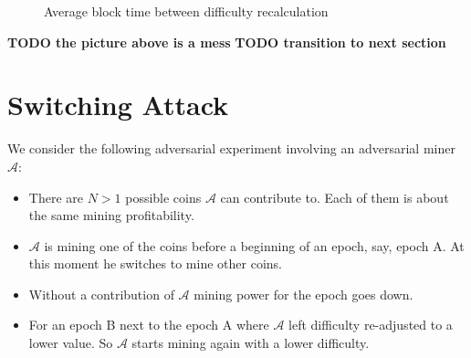 \documentclass[]{llncs}
\begin{document}
\begin{figure}[H]
\caption{Average block time between difficulty recalculation}
\label{fig:image}
\end{figure}

\textbf{TODO the picture above is a mess}
\textbf{TODO transition to next section}

\section{Switching Attack}
\label{sec:attack}

We consider the following adversarial experiment involving an adversarial miner \(\mathcal{A}\):

\begin{itemize}
\item There are \(N > 1\) possible coins \(\mathcal{A}\) can contribute to. Each of them is about the same mining profitability. 
\item \(\mathcal{A}\) is mining one of the coins before a beginning of an epoch, say, epoch A. At this moment he switches to mine other coins. 
\item Without a contribution of \(\mathcal{A}\) mining power for the epoch goes down. 
\item For an epoch B next to the epoch A where \(\mathcal{A}\) left difficulty re-adjusted to a lower value. So \(\mathcal{A}\) starts mining again with a lower difficulty. 
\end{itemize}
\end{document}
